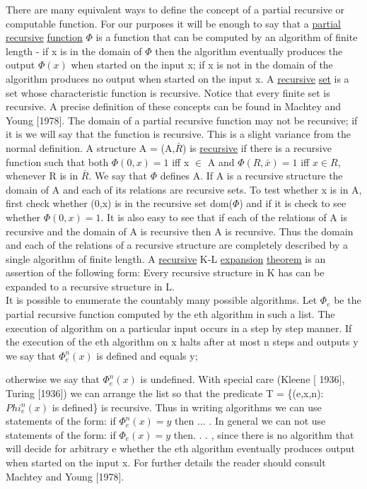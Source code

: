\documentclass[twoside]{article}
\begin{document}
There are many equivalent ways to define the concept of a partial recursive or computable function.    
For our purposes it will be enough to say that a \underline{partial} \underline{recursive} \underline{function}  $\Phi$    is a function that can be computed by an algorithm of finite length - if   x   is in the domain of $\Phi$ then the algorithm eventually produces the output $\Phi(x)$ when started on the input   x; if   x is not in the domain of     the algorithm produces no output when started on the input   x.   
A \underline{recursive} \underline{set} is a set whose characteristic function is recursive. 
Notice that every finite set is recursive. A precise definition of these concepts can be found in Machtey and Young [1978].   
The domain of a partial recursive function may not be recursive; if it is we will say that the function is recursive.   
This is a slight variance from the normal definition. 
A structure   A   = (A,$\bar{R}$)    is \underline{recursive} if there is a recursive function  such that both $\Phi(0,x) = 1$   iff   x $\in$ A   and $\Phi(R, \bar{x}) = 1$   iff   $x\in R$, whenever R is in $\bar{R}$. We say that $\Phi$   defines   A.   
If   A   is a recursive structure the domain of   A     and each of its relations are recursive sets.   
To test whether x   is in   A, first check whether   (0,x)   is in the recursive set   dom($\Phi$) and if it is check to see whether   $\Phi(0,x) = 1$.
It is also easy to see that if each of the relations of   A   is recursive and the domain of   A   is recursive then   A   is recursive.   
Thus the domain and each of the relations of a recursive structure are completely described by a single algorithm of finite length. 
A \underline{recursive} K-L \underline{expansion} \underline{theorem} is an assertion of the following form: Every recursive structure in K has can be expanded to a recursive structure in L.\\ 
\indent It is possible to enumerate the countably many possible algorithms. 
Let $\Phi_e$   be the partial recursive function computed by the eth algorithm in such a list.   
The execution of      algorithm on a particular input occurs in a step by step manner.    
If the execution of the   eth   algorithm   on   x   halts after at most   n   steps and outputs   y   we say that   $\Phi_e^n(x)$   is defined and equals y;
\newpage


\noindent otherwise we say that  $\Phi_e^n(x)$    is undefined.   With special care (Kleene [ 1936], Turing [1936]) we can arrange the list so that the predicate   T = \{(e,x,n): $Phi_e^n(x)$   is defined\} is recursive.    
Thus in writing algorithms we can use statements of the form: if $\Phi_e^n(x) = y$ then ...  .    In general we can not use statements of the form:  if    $\Phi_e(x) = y$ then. . . , since there is no algorithm that will decide for arbitrary   e   whether the   eth   algorithm eventually produces output when started on the input   x.    
For further details the reader should consult Machtey and Young [1978].\\
\end{document}

